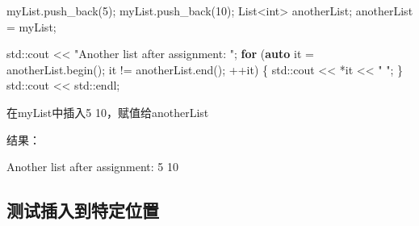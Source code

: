 \documentclass[
]{article}
\newenvironment{Shaded}{}{}
\newcommand{\BuiltInTok}[1]{\textcolor[rgb]{0.00,0.50,0.00}{#1}}
\newcommand{\ControlFlowTok}[1]{\textcolor[rgb]{0.00,0.44,0.13}{\textbf{#1}}}
\newcommand{\DataTypeTok}[1]{\textcolor[rgb]{0.56,0.13,0.00}{#1}}
\newcommand{\DecValTok}[1]{\textcolor[rgb]{0.25,0.63,0.44}{#1}}
\newcommand{\KeywordTok}[1]{\textcolor[rgb]{0.00,0.44,0.13}{\textbf{#1}}}
\newcommand{\NormalTok}[1]{#1}
\newcommand{\OperatorTok}[1]{\textcolor[rgb]{0.40,0.40,0.40}{#1}}
\newcommand{\StringTok}[1]{\textcolor[rgb]{0.25,0.44,0.63}{#1}}
\begin{document}
\begin{Shaded}
\begin{Highlighting}[]
\NormalTok{myList}\OperatorTok{.}\NormalTok{push\_back}\OperatorTok{(}\DecValTok{5}\OperatorTok{);}
\NormalTok{myList}\OperatorTok{.}\NormalTok{push\_back}\OperatorTok{(}\DecValTok{10}\OperatorTok{);}
\NormalTok{List}\OperatorTok{\textless{}}\DataTypeTok{int}\OperatorTok{\textgreater{}}\NormalTok{ anotherList}\OperatorTok{;}
\NormalTok{anotherList }\OperatorTok{=}\NormalTok{ myList}\OperatorTok{;}

\BuiltInTok{std::}\NormalTok{cout}\OperatorTok{ \textless{}\textless{}} \StringTok{"Another list after assignment: "}\OperatorTok{;}
\ControlFlowTok{for} \OperatorTok{(}\KeywordTok{auto}\NormalTok{ it }\OperatorTok{=}\NormalTok{ anotherList}\OperatorTok{.}\NormalTok{begin}\OperatorTok{();}\NormalTok{ it }\OperatorTok{!=}\NormalTok{ anotherList}\OperatorTok{.}\NormalTok{end}\OperatorTok{();} \OperatorTok{++}\NormalTok{it}\OperatorTok{)} \OperatorTok{\{}
    \BuiltInTok{std::}\NormalTok{cout}\OperatorTok{ \textless{}\textless{}} \OperatorTok{*}\NormalTok{it }\OperatorTok{\textless{}\textless{}} \StringTok{" "}\OperatorTok{;}
\OperatorTok{\}}
\BuiltInTok{std::}\NormalTok{cout}\OperatorTok{ \textless{}\textless{}} \BuiltInTok{std::}\NormalTok{endl}\OperatorTok{;}
\end{Highlighting}
\end{Shaded}

在myList中插入5 10，赋值给anotherList

结果：

\begin{Shaded}
\begin{Highlighting}[]
\NormalTok{Another list after assignment: 5 10}
\end{Highlighting}
\end{Shaded}

\hypertarget{ux6d4bux8bd5ux63d2ux5165ux5230ux7279ux5b9aux4f4dux7f6e}{%
\subsection{测试插入到特定位置}\label{ux6d4bux8bd5ux63d2ux5165ux5230ux7279ux5b9aux4f4dux7f6e}}
\end{document}
